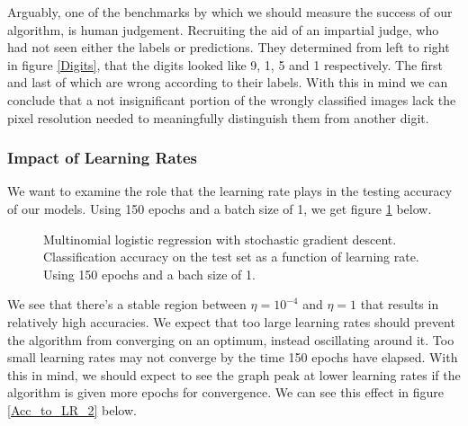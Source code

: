 \documentclass[11pt,a4paper,titlepage]{article}
\begin{document}
Arguably, one of the benchmarks by which we should measure the success of our algorithm, is human judgement. Recruiting the aid of an impartial judge, who had not seen either the labels or predictions. They determined from left to right in figure \ref{Digits}, that the digits looked like 9, 1, 5 and 1 respectively. The first and last of which are wrong according to their labels. With this in mind we can conclude that a not insignificant portion of the wrongly classified images lack the pixel resolution needed to meaningfully distinguish them from another digit.

\subsubsection{Impact of Learning Rates}
We want to examine the role that the learning rate plays in the testing accuracy of our models. Using 150 epochs and a batch size of 1, we get figure \ref{Acc_to_LR} below.

\begin{figure}[H]
\centering


\caption[Classification accuracy to learning rate (Softmax Regression)]{Multinomial logistic regression with stochastic gradient descent. Classification accuracy on the test set as a function of learning rate. Using 150 epochs and a bach size of 1.}\label{Acc_to_LR}
\end{figure}
We see that there's a stable region between $\eta = 10^{-4}$ and $\eta = 1$ that results in relatively high accuracies. We expect that too large learning rates should prevent the algorithm from converging on an optimum, instead oscillating around it. Too small learning rates may not converge by the time 150 epochs have elapsed. With this in mind, we should expect to see the graph peak at lower learning rates if the algorithm is given more epochs for convergence. We can see this effect in figure \ref{Acc_to_LR_2} below.
\end{document}

